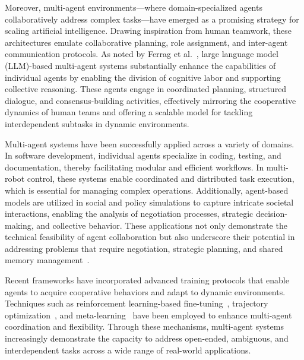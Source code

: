 Moreover, multi-agent environments—where domain-specialized agents collaboratively address complex tasks—have emerged as a promising strategy for scaling artificial intelligence. Drawing inspiration from human teamwork, these architectures emulate collaborative planning, role assignment, and inter-agent communication protocols. As noted by Ferrag et al.~\cite{ferrag2025can}, large language model (LLM)-based multi-agent systems substantially enhance the capabilities of individual agents by enabling the division of cognitive labor and supporting collective reasoning. These agents engage in coordinated planning, structured dialogue, and consensus-building activities, effectively mirroring the cooperative dynamics of human teams and offering a scalable model for tackling interdependent subtasks in dynamic environments.


\vspace{0.5cm}

Multi-agent systems have been successfully applied across a variety of domains. In software development, individual agents specialize in coding, testing, and documentation, thereby facilitating modular and efficient workflows. In multi-robot control, these systems enable coordinated and distributed task execution, which is essential for managing complex operations. Additionally, agent-based models are utilized in social and policy simulations to capture intricate societal interactions, enabling the analysis of negotiation processes, strategic decision-making, and collective behavior. These applications not only demonstrate the technical feasibility of agent collaboration but also underscore their potential in addressing problems that require negotiation, strategic planning, and shared memory management~\cite{weiss2013multiagent, wooldridge2009introduction, stone2000multiagent}.



\vspace{0.5cm}

Recent frameworks have incorporated advanced training protocols that enable agents to acquire cooperative behaviors and adapt to dynamic environments. Techniques such as reinforcement learning-based fine-tuning~\cite{lowe2017multi}, trajectory optimization~\cite{todorov2012optimal}, and meta-learning~\cite{finn2017model} have been employed to enhance multi-agent coordination and flexibility. Through these mechanisms, multi-agent systems increasingly demonstrate the capacity to address open-ended, ambiguous, and interdependent tasks across a wide range of real-world applications.

